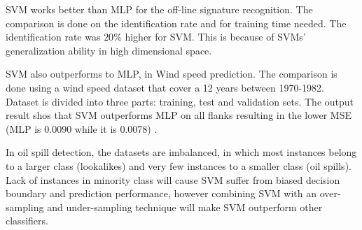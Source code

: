 SVM works better than MLP for the off-line signature recognition. The comparison is done on the identification rate and for training time needed. The identification rate was $20$\% higher for SVM. This is because of SVMs' generalization ability in high dimensional space\cite{FriasMartinez2006693}.

SVM also outperforms to MLP, in Wind speed prediction. The comparison is done using a wind speed dataset that cover a 12 years between 1970-1982. Dataset is divided into three parts: training, test and validation sets. The output result shos that SVM outperforms MLP on all flanks resulting in the lower MSE (MLP is 0.0090 while it is 0.0078) \cite{Mohandes2004939}.

In oil spill detection, the datasets are imbalanced, in which most instances belong to a larger class (lookalikes) and very few instances to a smaller class (oil spills). Lack of instances in minority class will cause SVM suffer from biased decision boundary and prediction performance, however combining SVM with an over-sampling and under-sampling technique will make SVM outperform other classifiers\cite{liu2006boosting}.
